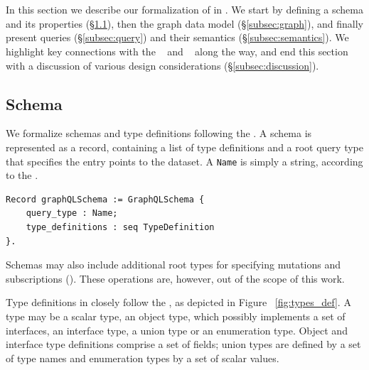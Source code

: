 \section{\gcoql}\label{sec:form}

In this section we describe our formalization of \gql in \coq. We start by defining a schema and its properties (\S\ref{subsec:schema}), then the graph data model (\S\ref{subsec:graph}), and finally present queries (\S\ref{subsec:query}) and their semantics (\S\ref{subsec:semantics}). We highlight key connections with the \spec~\cite{gqlspec} and \HP~\cite{gqlph} along the way, and end this section with a discussion of various design considerations (\S\ref{subsec:discussion}).



\subsection{Schema}\label{subsec:schema}
We formalize schemas and type definitions following the \spec. A
schema is represented as a record, containing a list of type
definitions and a root query type that specifies the entry points to the
dataset. A \texttt{Name} is simply a string, according to the \spec.
%

\begin{verbatim}
Record graphQLSchema := GraphQLSchema {
    query_type : Name;
    type_definitions : seq TypeDefinition
}.
\end{verbatim}
%
Schemas may also include additional root types for specifying
mutations and subscriptions (\cf \cite[\S3.2.1]{gqlspec}). These operations are, however, out of the scope of this work.

Type definitions in \gcoql closely follow the \spec, as
depicted in Figure~ \ref{fig:types_def}. A type may be a scalar type,
an object type, which possibly implements a set of interfaces, an
interface type, a union type or an enumeration type. Object and
interface type definitions comprise a set of fields; union
types are defined by a set of type names and enumeration types by a
set of scalar values. 

